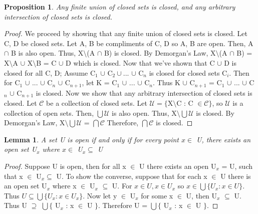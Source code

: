 \documentclass{amsart}
\theoremstyle{plain}
\newtheorem{lemma}[theorem]{Lemma}
\newtheorem{proposition}[theorem]{Proposition}
\theoremstyle{definition}
\theoremstyle{remark}
\begin{document}
  \begin{proposition}
      Any finite union of closed sets is closed, and any arbitrary intersection of closed sets is closed.
  \end{proposition}
  \begin{proof}
	We proceed by showing that any finite union of closed sets is closed. Let C, D be closed sets. Let A, B be compliments of C, D so A, B are open. Then, A $\cap$ B is also open. Thus, X$\setminus$(A $\cap$ B) is closed. By Demorgan's Law, X$\setminus$(A $\cap$ B) = X$\setminus$A $\cup$ X$\setminus$B = C $\cup$ D which is closed.
	\newline\newline Now that we've shown that C $\cup$ D is closed for all C, D; Assume C$_1$ $\cup $ C$_2 \cup ...$ $\cup $ C$_n$ is closed for closed sets C$_i$. Then for C$_1$ $\cup$ ... $\cup$ C$_n$ $\cup$ C$_{n+1}$, let K = C$_1$ $\cup$ ... $\cup$ C$_n$. Thus K $\cup$ C$_{n+1}$ = C$_1$ $\cup$ ... $\cup$ C$_n$ $\cup$ C$_{n+1}$ is closed.
	\newline\newline Now we show that any arbitrary intersection of closed sets is closed. Let $\mathcal{C}$ be a collection of closed sets. Let $\mathcal{U} = \lbrace$X$\setminus$C : C $\in \mathcal{C}\rbrace$, so $\mathcal{U}$ is a collection of open sets. Then, $\bigcup \mathcal{U}$ is also open. Thus, X$\setminus\bigcup\mathcal{U}$ is closed. By Demorgan's Law, X$\setminus\bigcup\mathcal{U}$ = $\bigcap\mathcal{C}$ Therefore, $\bigcap\mathcal{C}$ is closed.
	\end{proof}

	\begin{lemma}
	A set U is open if and only if for every point $x \in$ U, there exists an open set U$_x$ where $x \in $ U$_x \subseteq$ U
	\end{lemma}
	\begin{proof} Suppose U is open, then for all x $\in$ U there exists an open U$_x$ = U, such that x $\in$ U$_x \subseteq$ U.
	\newline
	To show the converse, suppose that for each x $\in$ U there is an open set U$_x$ where x $\in$ U$_x$ $\subseteq$ U. For $x \in U, x \in U_x$ so $x \in \bigcup \lbrace U_x : x \in U \rbrace$. Thus $U \subseteq \bigcup \lbrace U_x : x \in U_x \rbrace$. Now let y $\in$ U$_x$ for some x $\in$ U, then U$_x$ $\subseteq$ U. Thus U $\supseteq$ $\bigcup \lbrace$ U$_x$ : x $\in$ U $\rbrace$. Therefore U = $\bigcup \lbrace$ U$_x$ : x $\in$ U $\rbrace$.
	\end{proof}
\end{document}
